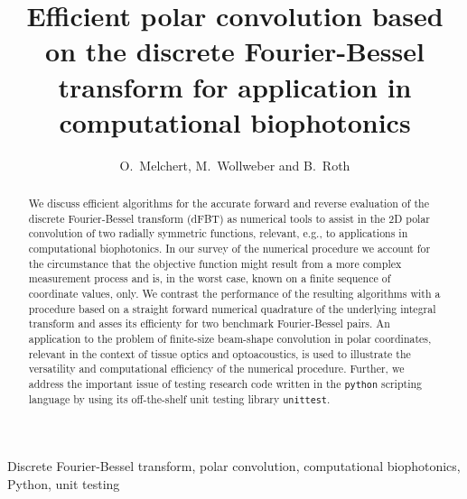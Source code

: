 \documentclass[12pt]{iopart}
\begin{document}

\title[dFBT for application in biophotonics]{Efficient polar convolution based
on the discrete Fourier-Bessel transform for application in computational
biophotonics}

\author{O.\ Melchert, M.\ Wollweber and B.\ Roth}

\address{Hanover Centre for Optical Technologies (HOT), 
Leibniz Universit\"at Hannover, 
Nienburger Str.\,17, 
D-30167 Hannover, Germany}


\begin{abstract}
We discuss efficient algorithms for the accurate forward and reverse evaluation
of the discrete Fourier-Bessel transform (dFBT) as numerical tools to assist in
the $2$D polar convolution of two radially symmetric functions, relevant, e.g.,
to applications in computational biophotonics.
  In our survey of the numerical procedure we account for the circumstance
that the objective function might result from a more complex measurement
process and is, in the worst case, known on a finite sequence of 
coordinate values, only.
  We contrast the performance of the resulting algorithms with a procedure
based on a straight forward numerical quadrature of the underlying integral
transform and asses its efficienty for two benchmark Fourier-Bessel pairs. 
  An application to the problem of finite-size beam-shape convolution in polar
coordinates, relevant in the context of tissue optics and optoacoustics, is
used to illustrate the versatility and computational efficiency of the
numerical procedure.
  Further, we address the important issue of testing research code written in
the {\tt{python}} scripting language by using its off-the-shelf unit testing
library {\tt{unittest}}.
\end{abstract}

 Discrete Fourier-Bessel transform, 
polar convolution, computational biophotonics, Python, unit testing


\maketitle
\end{document}
